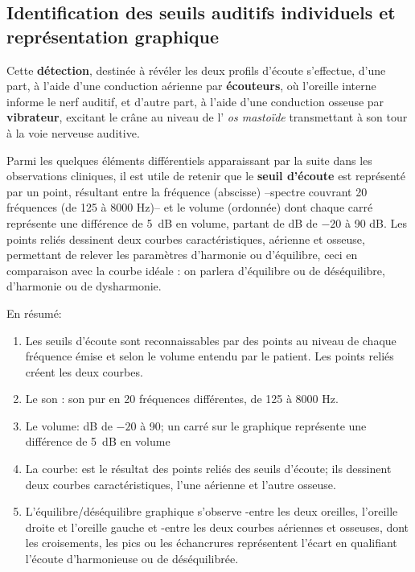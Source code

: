 \subsection*{Identification des seuils auditifs individuels et représentation graphique}

Cette \textbf{détection}, destinée à révéler les deux profils d'écoute
s'effectue, d'une part, à l'aide d'une
conduction aérienne par \textbf{écouteurs}, où l'oreille interne
informe le nerf auditif,  et d'autre part, à l'aide
d'une conduction osseuse par\textbf{ vibrateur}, excitant le crâne au
niveau de l'
\textit{os mastoïde} transmettant à son tour à  la voie nerveuse
auditive.

Parmi les quelques éléments différentiels
apparaissant par la suite dans les observations cliniques, il est utile de retenir
que le \textbf{seuil d'écoute} est représenté par un point, résultant entre la
fréquence (abscisse) --spectre couvrant 20
fréquences (de 125 à 8000 Hz)--   et le volume
(ordonnée) dont chaque carré représente une différence de \SI{5}{\dB} en
volume, partant de dB de $-20$ à 90 dB.
Les points reliés dessinent deux courbes caractéristiques, aérienne
et osseuse, permettant de relever les paramètres d'harmonie ou
          d'équilibre, ceci
 	en comparaison avec la courbe idéale : on parlera
        d'équilibre ou de
 	déséquilibre, d'harmonie ou de dysharmonie. 	
 	
En résumé: 
        \begin{enumerate}

  \item   Les seuils d'écoute sont reconnaissables par des points au niveau de
          chaque fréquence émise et selon le volume entendu par le
          patient. Les points reliés créent les deux courbes.
 	\item Le son : son pur en 20 fréquences différentes, de 125 à 8000 Hz.
 	\item Le volume: dB de $-20$ à 90; un carré sur le graphique représente une différence de \SI{5}{\dB} en
 		volume
 	\item La courbe: est le résultat des points reliés des seuils
          d'écoute; ils
          dessinent deux courbes caractéristiques, l'une aérienne et l'autre osseuse.
\item L'équilibre/déséquilibre graphique s'observe
        -entre les deux oreilles, l'oreille droite et l'oreille gauche
        et
        -entre les deux courbes aériennes et osseuses, dont les
        croisements, les pics ou les échancrures représentent
        l'écart en
        qualifiant l'écoute d'harmonieuse ou de
        déséquilibrée.
      \end{enumerate}

